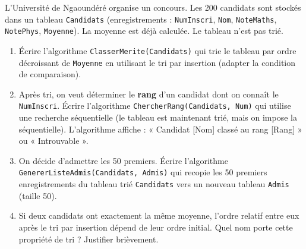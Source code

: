 \documentclass[11pt]{article}
\begin{document}
\begin{exercice}
L'Université de Ngaoundéré organise un concours. Les \num{200} candidats sont stockés dans un tableau \texttt{Candidats} (enregistrements : \texttt{NumInscri}, \texttt{Nom}, \texttt{NoteMaths}, \texttt{NotePhys}, \texttt{Moyenne}). La moyenne est déjà calculée. Le tableau n'est pas trié.

\begin{enumerate}
    \item Écrire l'algorithme \texttt{ClasserMerite(Candidats)} qui trie le tableau par ordre décroissant de \texttt{Moyenne} en utilisant le tri par insertion (adapter la condition de comparaison).
    \item Après tri, on veut déterminer le \textbf{rang} d'un candidat dont on connaît le \texttt{NumInscri}. Écrire l'algorithme \texttt{ChercherRang(Candidats, Num)} qui utilise une recherche séquentielle (le tableau est maintenant trié, mais on impose la séquentielle). L'algorithme affiche : « Candidat [Nom] classé au rang [Rang] » ou « Introuvable ».
    \item On décide d'admettre les 50 premiers. Écrire l'algorithme \texttt{GenererListeAdmis(Candidats, Admis)} qui recopie les 50 premiers enregistrements du tableau trié \texttt{Candidats} vers un nouveau tableau \texttt{Admis} (taille 50).
    \item Si deux candidats ont exactement la même moyenne, l'ordre relatif entre eux après le tri par insertion dépend de leur ordre initial. Quel nom porte cette propriété de tri ? Justifier brièvement.
\end{enumerate}
\end{exercice}
\end{document}
